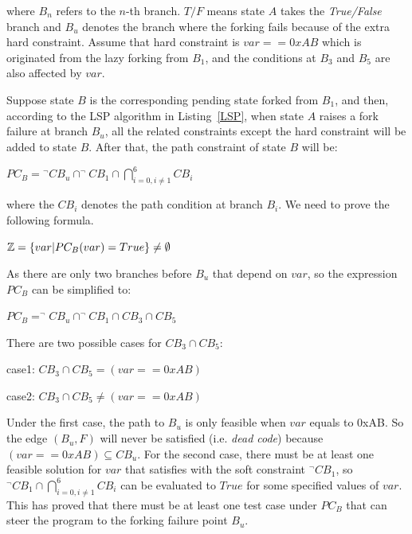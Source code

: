 \noindent where $B_n$ refers to the $n$-th branch. $T/F$ means state $A$ takes the \emph{True/False} branch and $B_u$ denotes the branch where the forking fails because of the extra hard constraint. Assume that hard constraint is $var==0xAB$ which is originated from the lazy forking from $B_1$, and the conditions at $B_3$ and $B_5$ are also affected by $var$.

Suppose state $B$ is the corresponding pending state forked from $B_1$, and then, according to the LSP algorithm in Listing~\ref{LSP}, when state $A$ raises a fork failure at branch $B_u$, all the related constraints except the hard constraint will be added to state $B$. After that, the path constraint of state $B$ will be:

\begin{center}
$PC_B = \displaystyle ^\neg CB_u \cap ^\neg CB_1 \cap \bigcap\limits_{i=0,i \neq 1}^{6} CB_i$
\end{center}
\noindent where the $CB_i$ denotes the path condition at branch $B_i$. We need to prove the following formula.
 
\begin{center}
$\mathbb{Z} = \{var\arrowvert PC_B(var) = True\} \neq \emptyset$
\end{center}

As there are only two branches before $B_u$ that depend on $var$, so the expression $PC_B$ can be simplified to:
\begin{center}
$PC_B = ^\neg CB_u \cap ^\neg CB_1 \cap CB_3 \cap CB_5$
\end{center}

There are two possible cases for $CB_3 \cap CB_5$:
\begin{center}
case1: $CB_3 \cap CB_5 = (var == 0xAB)$

case2: $CB_3 \cap CB_5 \neq (var == 0xAB)$
\end{center}

Under the first case, the path to $B_u$ is only feasible when $var$ equals to 0xAB. So the edge $(B_u, F)$ will never be satisfied (i.e. \emph{dead code}) because $(var == 0xAB) \subseteq CB_u$. For the second case, there must be at least one feasible solution for $var$ that satisfies with the soft constraint $^\neg CB_1$, so $^\neg CB_1 \cap \bigcap_{i=0,i \neq 1}^{6} CB_i$ can be evaluated to $True$ for some specified values of $var$. This has proved that there must be at least one test case under $PC_B$ that can steer the program to the forking failure point $B_u$.

